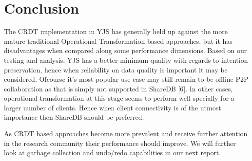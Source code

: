 \documentclass[9pt, titlepage]{article}
\begin{document}
  \section{Conclusion}
  The CRDT implementation in YJS has generally held up against the more mature traditional Operational Transformation based approaches,
  but it has disadvantages when compared along some performance dimensions.
  Based on our testing and analysis, YJS has a better minimum quality with regards to intention preservation,
  hence when reliability on data quality is important it may be considered.
  Ofcourse it's most popular use case may still remain to be offline P2P collaboration as that is simply not supported in ShareDB [6].
  In other cases, operational transformation at this stage seems to perform well specially for a larger number of clients.
  Hence when client connectivity is of the utmost importance then ShareDB should be preferred.

  As CRDT based approaches become more prevalent and receive further attention in the research community their performance should improve.
  We will further look at garbage collection and undo/redo capabilities in our next report.

  \break
\end{document}
